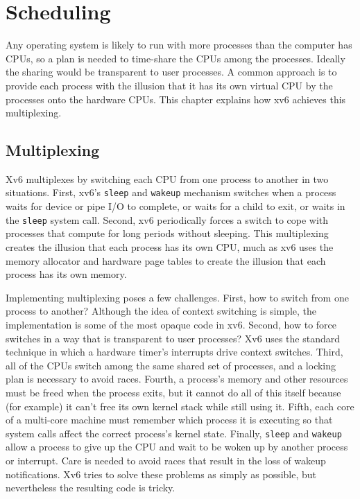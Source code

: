 % 
%  
\chapter{Scheduling}
\label{CH:SCHED}

Any operating system is likely to run with more processes than the
computer has CPUs, so a plan is needed to time-share the
CPUs among the processes. Ideally the sharing would be transparent to user
processes.  A common approach is to provide each process
with the illusion that it has its own virtual CPU by
the processes onto the hardware CPUs.
This chapter explains how xv6 achieves this multiplexing.
\section{Multiplexing}

Xv6 multiplexes by switching each CPU from one process to
another in two situations. First, xv6's
\lstinline{sleep}
and
\lstinline{wakeup}
mechanism switches when a process waits
for device or pipe I/O to complete, or waits for a child
to exit, or waits in the
\lstinline{sleep}
system call.
Second, xv6 periodically forces a switch to cope with
processes that compute for long periods without sleeping.
This multiplexing creates the illusion that
each process has its own CPU, much as xv6 uses the memory allocator and hardware
page tables to create the illusion that each process has its own memory.

Implementing multiplexing poses a few challenges. First, how to switch from one
process to another? 
Although the idea of context switching
is simple, the implementation is some of the most opaque code
in xv6. Second, how to force
switches in a way that is transparent to user processes?  Xv6 uses the
standard technique in which a hardware timer's interrupts drive context switches.
Third, all of the CPUs switch among the same shared set of processes, and a
locking plan is necessary to avoid races. Fourth, a process's
memory and other resources must be freed when the process exits,
but it cannot do all of this itself
because (for example) it can't free its own kernel stack while still using it.
Fifth, each core of a multi-core machine must remember which
process it is executing so that system calls affect the correct
process's kernel state.
Finally,  \lstinline{sleep} and \lstinline{wakeup} allow a process to give up
the CPU and wait to be woken up by another process or interrupt.
Care is needed to avoid races that result in
the loss of wakeup notifications.
Xv6 tries to solve these problems as
simply as possible, but nevertheless the resulting code is
tricky.


